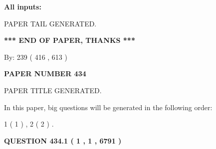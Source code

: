 \documentclass{ctexart}
\begin{document}
   
   
   
\noindent{}
   
   
   
   
\noindent\vspace{0.1in}\hspace{-0.08in} {\textbf{\Large{All inputs: }}}
   
   
   
   
   
   
 \vspace{0.2in}
 
   
   
\vspace{2.0in} PAPER TAIL GENERATED.
   
   
   
   
\vspace{1.0in} 
{\textbf{\large{ *** END OF PAPER, THANKS *** }}} 
   
   
\hspace{1.0in} By: 
 239 ( 416 ,  613 )
   
   
   
   
\newpage 
\setcounter{page}{ 
   434001 } 
   
   
   
   
 {\textbf{ \Large{ PAPER NUMBER  434  }}}
   
   
\vspace{0.2in}
   
   
   
   
   
   
   
   
 \vspace{0.2in}
 
 
 
 
   
   
 PAPER TITLE GENERATED.
   
   
   
\vspace{0.2in}
   
In this paper, big questions will be generated in the following order: 
   
   
   1 ( 1 )
 ,
   2 ( 2 )
 .
  
\vspace{0.2in}
  
{\textbf{\Large{QUESTION
434.1 
 ( 1 , 1 , 6791 )
}}}
  
\end{document}
